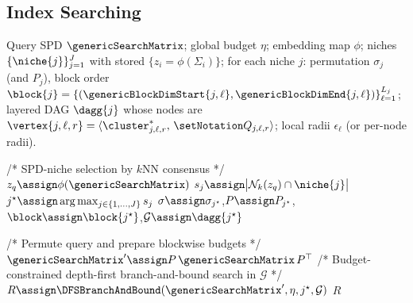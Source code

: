 \documentclass[pdflatex,sn-mathphys-num]{sn-jnl}%
\theoremstyle{thmstyleone}%
\theoremstyle{thmstyletwo}%
\theoremstyle{thmstylethree}%
\begin{document}
\subsection{Index Searching}

\begin{algorithm}[h]
\caption{$\searchIdx(\genericSearchMatrix,\eta)$}
\label{alg:search}
\begin{algorithmic}[1]
\footnotesize

\Require Query SPD $\genericSearchMatrix$; global budget $\eta$; embedding map $\phi$; niches $\{\niche{j}\}_{j=1}^{J}$ with stored $\{z_i=\phi(\Sigma_i)\}$; for each niche $j$: permutation $\sigma_j$ (and $P_j$), block order $\block{j}=\{(\genericBlockDimStart{j,\ell},\genericBlockDimEnd{j,\ell})\}_{\ell=1}^{L_j}$; layered DAG $\dagg{j}$ whose nodes are $\vertex{j,\ell,r}=\langle \cluster^{\ast}_{j,\ell,r},\,\spdMatrixIDList{j,\ell,r}\rangle$; local radii $\epsilon_\ell$ (or per-node radii).

\vspace{0.15em}
\Statex /* SPD-niche selection by $k$NN consensus */
\State $z_q \assign \phi(\genericSearchMatrix)$
  \State $s_j \assign \bigl|\mathcal{N}_k(z_q)\cap \niche{j}\bigr|$ 
\EndFor
\State $j^\star \assign \arg\max_{j\in\{1,\dots,J\}} s_j$
\State $\sigma \assign \sigma_{j^\star}$,\quad $P \assign P_{j^\star}$,\quad $\block \assign \block{j^\star}$,\quad $\mathcal{G} \assign \dagg{j^\star}$

\vspace{0.25em}
\Statex /* Permute query and prepare blockwise budgets */
\State $\genericSearchMatrix' \assign P\,\genericSearchMatrix\,P^{\top}$ 
\Statex /* Budget-constrained depth-first branch-and-bound search in $\mathcal{G}$ */
\State $R \assign \DFSBranchAndBound(\genericSearchMatrix',\eta,j^\star,\mathcal{G})$
\vspace{0.15em}
\State \Return $R$
\end{algorithmic}
\end{algorithm}
\end{document}
